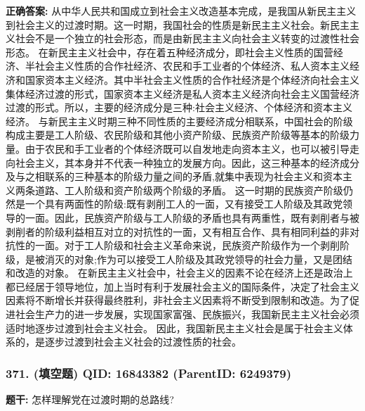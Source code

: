 \documentclass[12pt,UTF8]{ctexart}
\begin{document}
\textbf{正确答案:}
从中华人民共和国成立到社会主义改造基本完成，是我国从新民主主义到社会主义的过渡时期。这一时期，我国社会的性质是新民主主义社会。新民主主义社会不是一个独立的社会形态，而是由新民主主义向社会主义转变的过渡性社会形态。
在新民主主义社会中，存在着五种经济成分，即社会主义性质的国营经济、半社会主义性质的合作社经济、农民和手工业者的个体经济、私人资本主义经济和国家资本主义经济。其中半社会主义性质的合作社经济是个体经济向社会主义集体经济过渡的形式，国家资本主义经济是私人资本主义经济向社会主义国营经济过渡的形式。所以，主要的经济成分是三种:社会主义经济、个体经济和资本主义经济。
与新民主主义时期三种不同性质的主要经济成分相联系，中国社会的阶级构成主要是工人阶级、农民阶级和其他小资产阶级、民族资产阶级等基本的阶级力量。由于农民和手工业者的个体经济既可以自发地走向资本主义，也可以被引导走向社会主义，其本身并不代表一种独立的发展方向。因此，这三种基本的经济成分及与之相联系的三种基本的阶级力量之间的矛盾,就集中表现为社会主义和资本主义两条道路、工人阶级和资产阶级两个阶级的矛盾。
这一时期的民族资产阶级仍然是一个具有两面性的阶级:既有剥削工人的一面，又有接受工人阶级及其政党领导的一面。因此，民族资产阶级与工人阶级的矛盾也具有两重性，既有剥削者与被剥削者的阶级利益相互对立的对抗性的一面，又有相互合作、具有相同利益的非对抗性的一面。对于工人阶级和社会主义革命来说，民族资产阶级作为一个剥削阶级，是被消灭的对象;作为可以接受工人阶级及其政党领导的社会力量，又是团结和改造的对象。
在新民主主义社会中，社会主义的因素不论在经济上还是政治上都已经居于领导地位，加上当时有利于发展社会主义的国际条件，决定了社会主义因素将不断增长并获得最终胜利，非社会主义因素将不断受到限制和改造。为了促进社会生产力的进一步发展，实现国家富强、民族振兴，我国新民主主义社会必须适时地逐步过渡到社会主义社会。
因此，我国新民主主义社会是属于社会主义体系的，是逐步过渡到社会主义社会的过渡性质的社会。

\vspace{0.3em}\hrulefill\vspace{0.7em}

\subsubsection*{371. (填空题) \small QID: 16843382 (ParentID: 6249379)}

\textbf{题干:}
怎样理解党在过渡时期的总路线?
\end{document}
